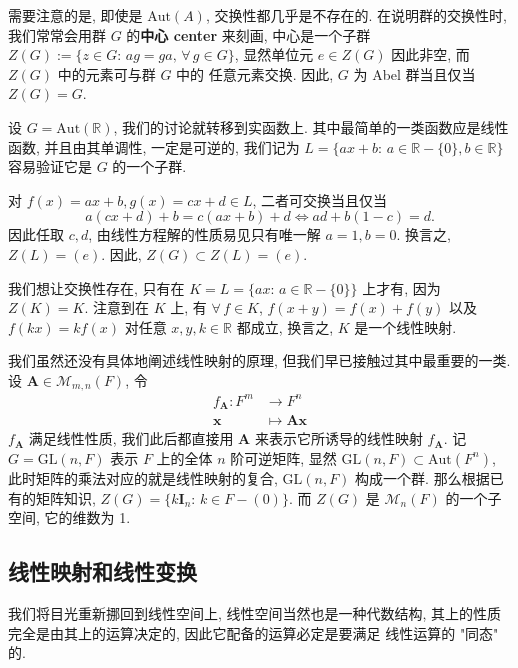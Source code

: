 \documentclass[UTF8]{book}
\begin{document}
需要注意的是, 即使是 $\mathrm{Aut}(A)$, 交换性都几乎是不存在的. 
在说明群的交换性时, 我们常常会用群 $G$ 的\textbf{中心 center }来刻画, 
中心是一个子群 $Z(G):=\{z \in G: \, ag = ga, \, \forall\,g\in G\}$, 
显然单位元 $e\in Z(G)$ 因此非空, 而 $Z(G)$ 中的元素可与群 $G$ 中的
任意元素交换. 因此, $G$ 为 Abel 群当且仅当 $Z(G)=G$. 

\begin{example}
    设 $G = \mathrm{Aut}(\mathbb{R})$, 我们的讨论就转移到实函数上. 
    其中最简单的一类函数应是线性函数, 并且由其单调性, 一定是可逆的, 
    我们记为 $L=\{ax+b:\,a \in \mathbb{R}-\{0\},b \in \mathbb{R}\}$ 
    容易验证它是 $G$ 的一个子群. 

    对 $f(x)=ax+b,g(x)=cx+d \in L$, 二者可交换当且仅当 
    $$a(cx+d)+b = c(ax+b)+d \Longleftrightarrow ad+b(1-c) =d.$$
    因此任取 $c,d$, 由线性方程解的性质易见只有唯一解 $a=1,b=0$. 
    换言之, $Z(L)=(e)$. 因此, $Z(G)\subset Z(L)=(e)$. 

    我们想让交换性存在, 只有在 
    $K = L=\{ax:\,a \in \mathbb{R}-\{0\}\}$ 上才有, 
    因为 $Z(K) = K$. 
    注意到在 $K$ 上, 有 $\forall\,f \in K$, 
    $f(x+y)=f(x)+f(y)$ 以及 $f(kx) = kf(x)$ 对任意 $x,y,k \in \mathbb{R}$ 
    都成立, 换言之, $K$ 是一个线性映射. 

    我们虽然还没有具体地阐述线性映射的原理, 但我们早已接触过其中最重要的一类. 
    设 $\boldsymbol{A} \in \mathcal{M}_{m,n}(F)$, 
    令 
    $$\begin{aligned}
        f_{\boldsymbol{A}}: F^m &\to F^n \\
        \boldsymbol{x} &\mapsto   \boldsymbol{Ax}  
    \end{aligned}
    $$
    $f_{\boldsymbol{A}}$ 满足线性性质, 我们此后都直接用 $\boldsymbol{A}$ 
    来表示它所诱导的线性映射 $f_{\boldsymbol{A}}$. 
    记 $G=\mathrm{GL}(n,F)$ 表示 $F$ 上的全体 $n$ 阶可逆矩阵, 
    显然 $\mathrm{GL}(n,F) \subset \mathrm{Aut}(F^n)$, 
    此时矩阵的乘法对应的就是线性映射的复合, $\mathrm{GL}(n,F)$ 构成一个群. 
    那么根据已有的矩阵知识, $Z(G) = \{k\boldsymbol{I}_n:\,k\in F-(0)\}$. 
    而 $Z(G)$ 是 $\mathcal{M}_n(F)$ 的一个子空间, 它的维数为 1. 
\end{example}



\subsection{线性映射和线性变换}

我们将目光重新挪回到线性空间上, 线性空间当然也是一种代数结构, 
其上的性质完全是由其上的运算决定的, 因此它配备的运算必定是要满足
线性运算的 "同态" 的. 
\end{document}
